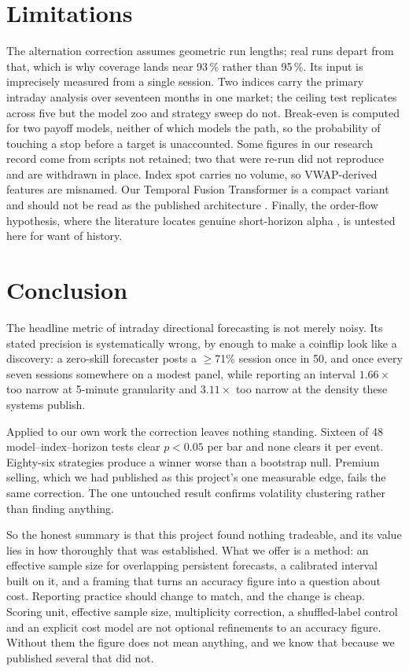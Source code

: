 \documentclass[sigconf,nonacm]{acmart}
\begin{document}
\section{Limitations}

The alternation correction assumes geometric run lengths; real runs depart from
that, which is why coverage lands near 93\,\% rather than 95\,\%. Its input is imprecisely measured from
a single session. Two indices carry the primary intraday analysis over seventeen
months in one market; the ceiling test replicates across five but the model zoo
and strategy sweep do not. Break-even is computed for two payoff models, neither
of which models the path, so the probability of touching a stop before a target
is unaccounted. Some figures in our research record come from scripts not
retained; two that were re-run did not reproduce and are withdrawn in place.
Index spot carries no volume, so VWAP-derived features are misnamed. Our
Temporal Fusion Transformer is a compact variant and should not be read as the
published architecture \cite{lim2021}. Finally, the order-flow hypothesis, where
the literature locates genuine short-horizon alpha \cite{kolm2023,zhang2019},
is untested here for want of history.

\section{Conclusion}

The headline metric of intraday directional forecasting is not merely noisy. Its
stated precision is systematically wrong, by enough to make a coinflip look like
a discovery: a zero-skill forecaster posts a $\geq$71\% session once in 50, and
once every seven sessions somewhere on a modest panel, while reporting an
interval $1.66\times$ too narrow at 5-minute granularity and $3.11\times$ too
narrow at the density these systems publish.

Applied to our own work the correction leaves nothing standing. Sixteen of 48
model--index--horizon tests clear $p<0.05$ per bar and none clears it per event.
Eighty-six strategies produce a winner worse than a bootstrap null. Premium
selling, which we had published as this project's one measurable edge, fails the
same correction. The one untouched result confirms volatility clustering rather
than finding anything.

So the honest summary is that this project found nothing tradeable, and its
value lies in how thoroughly that was established. What we offer is a method: an
effective sample size for overlapping persistent forecasts, a calibrated
interval built on it, and a framing that turns an accuracy figure into a
question about cost. Reporting practice should change to match, and the change
is cheap. Scoring unit, effective sample size, multiplicity correction, a
shuffled-label control and an explicit cost model are not optional refinements
to an accuracy figure. Without them the figure does not mean anything, and we
know that because we published several that did not.
\end{document}
